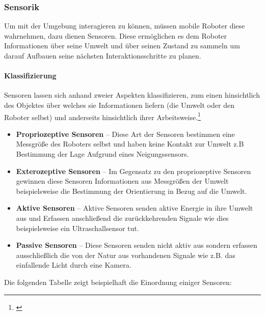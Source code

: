 \subsubsection{Sensorik}
\color{finishing}
Um mit der Umgebung interagieren zu können, müssen mobile Roboter diese wahrnehmen, dazu dienen Sensoren. Diese ermöglichen es dem Roboter Informationen über seine Umwelt und über seinen Zustand zu sammeln um darauf Aufbauen seine nächsten Interaktionsschritte zu planen.
\paragraph{Klassifizierung}
\color{finishing}
Sensoren lassen sich anhand zweier Aspekten klassifizieren, zum einen hinsichtlich des Objektes über welches sie Informationen liefern (die Umwelt oder den Roboter selbst) und anderseits hinsichtlich ihrer Arbeitsweise.\footnote{\citep[vgl.][Mobile Roboter, Seite 24]{Hertzberg.MobileRoboter}\label{note6}}
\begin{itemize}
	\item{\textbf{Propriozeptive Sensoren}} -- Diese Art der Sensoren bestimmen eine Messgröße des Roboters selbst und haben keine \glqq{}Kontakt\grqq{} zur Umwelt z.B Bestimmung der Lage Aufgrund eines Neigungssensors.
	\item{\textbf{Exterozeptive Sensoren}} -- Im Gegensatz zu den propriozeptive Sensoren gewinnen diese Sensoren Informationen aus Messgrößen der Umwelt beispielsweise die Bestimmung der Orientierung in Bezug auf die Umwelt.
	\item{\textbf{Aktive Sensoren}} -- Aktive Sensoren senden aktive Energie in ihre Umwelt aus und Erfassen anschließend die zurückkehrenden Signale wie dies beispielsweise ein Ultraschallsensor tut.
	\item{\textbf{Passive Sensoren}} -- Diese Sensoren senden nicht aktiv aus sondern erfassen ausschließlich die von der Natur aus vorhandenen Signale wie z.B. das einfallende Licht durch eine Kamera.
\end{itemize}
Die folgenden Tabelle zeigt beispielhaft die Einordnung einiger Sensoren:
